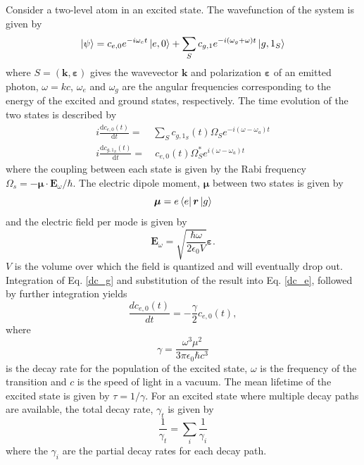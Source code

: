 Consider a two-level atom in an excited state. The wavefunction of the system is given by
\begin{equation}
\ket{\psi} = c_{e,0}e^{-i\omega_et}\ket{e,0} + \sum_Sc_{g,1}e^{-i(\omega_g+\omega)t}\ket{g,1_S}
\end{equation}
where $S = (\bm{k},\bm{\varepsilon})$ gives the wavevector $\bm{k}$ and polarization $\bm{\varepsilon}$ of an emitted photon, $\omega = kc$, $\omega_e$ and $\omega_g$ are the angular frequencies corresponding to the energy of the excited and ground states, respectively. \cite{LasCool} The time evolution of the two states is described by
\begin{align}
i\frac{\mathrm{d}c_{e,0}(t)}{\mathrm{d}t} =& \sum_Sc_{g,1_S}(t)\Omega_S e^{-i(\omega-\omega_a)t} \label{dc_e} \\
i\frac{\mathrm{d}c_{g,1_S}(t)}{\mathrm{d}t} =& \ c_{e,0}(t)\Omega_S^*e^{i(\omega-\omega_a)t} \label{dc_g}
\end{align}
where the coupling between each state is given by the Rabi frequency \\$\Omega_s = -\bm{\mu}\cdot\bm{E}_{\omega}/\hbar$. The electric dipole moment, $\bm{\mu}$ between two states is given by
\begin{equation}
\bm{\mu} = e\bra{e}\bm{r}\ket{g} 
\end{equation}
and the electric field per mode is given by
\begin{equation}
\bm{E}_{\omega} = \sqrt{\frac{\hbar\omega}{2\epsilon_0V}}\bm{\varepsilon}.
\end{equation}
$V$ is the volume over which the field is quantized and will eventually drop out. Integration of Eq. \ref{dc_g} and substitution of the result into Eq. \ref{dc_e}, followed by further integration yields 
\begin{equation}
\frac{d c_{e,0}(t)}{dt} = -\frac{\gamma}{2}c_{e,0}(t),
\end{equation}
where
\begin{equation}
\gamma = \frac{\omega^3\mu^2}{3\pi\epsilon_0\hbar c^3}
\label{gamma}
\end{equation}
is the decay rate for the population of the excited state, $\omega$ is the frequency of the transition and $c$ is the speed of light in a vacuum. The mean lifetime of the excited state is given by $\tau = 1/\gamma$. For an excited state where multiple decay paths are available, the total decay rate, $\gamma_t$ is given by
\begin{equation}
\frac{1}{\gamma_t} = \sum_i \frac{1}{\gamma_i}
\label{totdec}
\end{equation}
where the $\gamma_i$ are the partial decay rates for each decay path.


